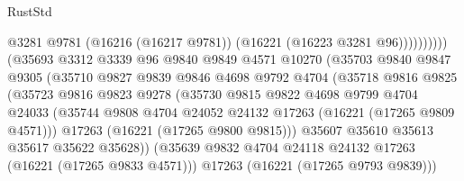 \begin{lexlean}{RustStd}
\begin{coremodule}
                                          @3281
                                          @9781
                                          (@16216 (@16217 @9781))
                                          (@16221 (@16223 @3281 @96))))))))))
                          (@35693
                            @3312
                            @3339
                            @96
                            @9840
                            @9849
                            @4571
                            @10270
                            (@35703
                              @9840
                              @9847
                              @9305
                              (@35710
                                @9827
                                @9839
                                @9846
                                @4698
                                @9792
                                @4704
                                (@35718
                                  @9816
                                  @9825
                                  (@35723
                                    @9816
                                    @9823
                                    @9278
                                    (@35730
                                      @9815
                                      @9822
                                      @4698
                                      @9799
                                      @4704
                                      @24033
                                      (@35744
                                        @9808
                                        @4704
                                        @24052
                                        @24132
                                        @17263
                                        (@16221 (@17265 @9809 @4571)))
                                      @17263
                                      (@16221 (@17265 @9800 @9815)))
                                    @35607
                                    @35610
                                    @35613
                                    @35617
                                    @35622
                                    @35628))
                                (@35639
                                  @9832
                                  @4704
                                  @24118
                                  @24132
                                  @17263
                                  (@16221 (@17265 @9833 @4571)))
                                @17263
                                (@16221 (@17265 @9793 @9839)))

\end{coremodule}
\end{lexlean}
